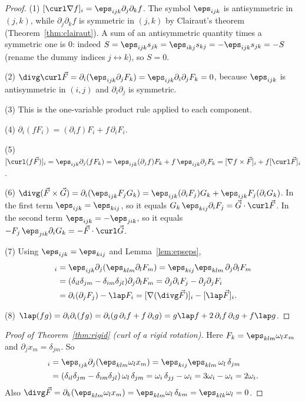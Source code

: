 \begin{proof}
(1) $[\curl\nabla f]_i=\eps_{ijk}\partial_j\partial_kf$. The symbol $\eps_{ijk}$ is antisymmetric in $(j,k)$, while $\partial_j\partial_kf$ is symmetric in $(j,k)$ by Clairaut's theorem (Theorem~\ref{thm:clairaut}). A sum of an antisymmetric quantity times a symmetric one is $0$: indeed $S=\eps_{ijk}s_{jk}=\eps_{ikj}s_{kj}=-\eps_{ijk}s_{jk}=-S$ (rename the dummy indices $j\leftrightarrow k$), so $S=0$.

(2) $\divg\curl\vec F=\partial_i(\eps_{ijk}\partial_jF_k)=\eps_{ijk}\partial_i\partial_jF_k=0$, because $\eps_{ijk}$ is antisymmetric in $(i,j)$ and $\partial_i\partial_j$ is symmetric.

(3) This is the one-variable product rule applied to each component.

(4) $\partial_i(fF_i)=(\partial_if)F_i+f\,\partial_iF_i$.

(5) $[\curl(f\vec F)]_i=\eps_{ijk}\partial_j(fF_k)=\eps_{ijk}(\partial_jf)F_k+f\,\eps_{ijk}\partial_jF_k=[\nabla f\times\vec F]_i+f[\curl\vec F]_i$.

(6) $\divg(\vec F\times\vec G)=\partial_i(\eps_{ijk}F_jG_k)=\eps_{ijk}(\partial_iF_j)G_k+\eps_{ijk}F_j(\partial_iG_k)$. In the first term $\eps_{ijk}=\eps_{kij}$, so it equals $G_k\,\eps_{kij}\partial_iF_j=\vec G\cdot\curl\vec F$. In the second term $\eps_{ijk}=-\eps_{jik}$, so it equals $-F_j\,\eps_{jik}\partial_iG_k=-\vec F\cdot\curl\vec G$.

(7) Using $\eps_{ijk}=\eps_{kij}$ and Lemma~\ref{lem:epseps},
\begin{align*}
[\curl\curl\vec F]_i&=\eps_{ijk}\partial_j(\eps_{klm}\partial_lF_m)=\eps_{kij}\eps_{klm}\,\partial_j\partial_lF_m\\
&=(\delta_{il}\delta_{jm}-\delta_{im}\delta_{jl})\partial_j\partial_lF_m=\partial_j\partial_iF_j-\partial_j\partial_jF_i\\
&=\partial_i(\partial_jF_j)-\lap F_i=[\nabla(\divg\vec F)]_i-[\lap\vec F]_i .
\end{align*}

(8) $\lap(fg)=\partial_i\partial_i(fg)=\partial_i(g\,\partial_if+f\,\partial_ig)=g\lap f+2\,\partial_if\,\partial_ig+f\lap g$.
\end{proof}

\begin{proof}[Proof of Theorem~\ref{thm:rigid} (curl of a rigid rotation)]
Here $F_k=\eps_{klm}\omega_lx_m$ and $\partial_jx_m=\delta_{jm}$. So
\begin{align*}
[\curl\vec F]_i&=\eps_{ijk}\partial_j(\eps_{klm}\omega_lx_m)=\eps_{kij}\eps_{klm}\,\omega_l\,\delta_{jm}\\
&=(\delta_{il}\delta_{jm}-\delta_{im}\delta_{jl})\,\omega_l\,\delta_{jm}=\omega_i\,\delta_{jj}-\omega_i=3\omega_i-\omega_i=2\omega_i .
\end{align*}
Also $\divg\vec F=\partial_k(\eps_{klm}\omega_lx_m)=\eps_{klm}\omega_l\,\delta_{km}=\eps_{kl k}\omega_l=0$.
\end{proof}

